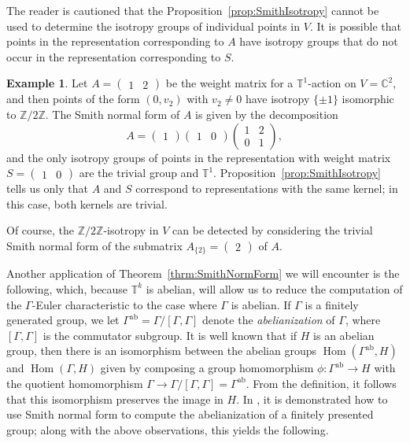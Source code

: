 \documentclass[twoside]{amsart}
\theoremstyle{definition}
\newtheorem{example}[theorem]{Example}
\theoremstyle{remark}
\numberwithin{equation}{section}
\newcommand{\C}{\mathbb{C}}
\newcommand{\T}{\mathbb{T}}
\newcommand{\Z}{\mathbb{Z}}
\newcommand{\ab}{\text{ab}}
\newcommand{\HOM}{\operatorname{Hom}}
\begin{document}
The reader is cautioned that the Proposition~\ref{prop:SmithIsotropy} cannot be used to determine the isotropy groups of individual points in $V$.
It is possible that points in the representation corresponding to $A$ have isotropy groups that do not occur in the representation corresponding to $S$.

\begin{example}
\label{ex:SmithUnequalIsotropy}
Let $A = \begin{pmatrix} 1 & 2 \end{pmatrix}$ be the weight matrix for a $\T^1$-action on $V = \C^2$, and then points of the form $(0,v_2)$ with $v_2\neq 0$
have isotropy $\{\pm 1\}$ isomorphic to $\Z/2\Z$. The Smith normal form of $A$ is given by the decomposition
\[
    A   =   \begin{pmatrix} 1 \end{pmatrix}
            \begin{pmatrix} 1 & 0 \end{pmatrix}
            \begin{pmatrix} 1 & 2 \\ 0 & 1 \end{pmatrix},
\]
and the only isotropy groups of points in the representation with weight matrix $S = \begin{pmatrix} 1 & 0 \end{pmatrix}$ are the trivial group and $\T^1$.
Proposition~\ref{prop:SmithIsotropy} tells us only that $A$ and $S$ correspond to representations with the same kernel; in this case, both kernels are trivial.

Of course, the $\Z/2\Z$-isotropy in $V$ can be detected by considering the trivial Smith normal form of the submatrix $A_{\{2\}} = \begin{pmatrix} 2 \end{pmatrix}$
of $A$.
\end{example}

Another application of Theorem~\ref{thrm:SmithNormForm} we will encounter is the following, which, because $\T^k$ is abelian,
will allow us to reduce the computation of the $\Gamma$-Euler characteristic to the case where $\Gamma$ is abelian.
If $\Gamma$ is a finitely generated group, we let $\Gamma^{\ab} = \Gamma/[\Gamma, \Gamma]$ denote the \emph{abelianization} of $\Gamma$, where
$[\Gamma, \Gamma]$ is the commutator subgroup. It is well known that if $H$ is an abelian group, then there is an isomorphism between the abelian groups
$\HOM(\Gamma^{\ab},H)$ and $\HOM(\Gamma,H)$ given by composing a group homomorphism $\phi\colon \Gamma^{\ab}\to H$ with the quotient homomorphism
$\Gamma\to\Gamma/[\Gamma,\Gamma] = \Gamma^{\ab}$. From the definition, it follows that this isomorphism preserves the image in $H$.
In \cite[Sec.~9.2]{HoltEickOBrienBook}, it is demonstrated how to use Smith normal form to compute the abelianization of a finitely presented group;
along with the above observations, this yields the following.
\end{document}
